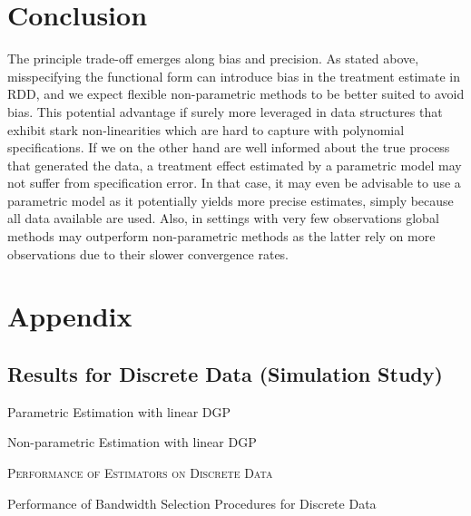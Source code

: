 \documentclass[11pt, a4paper, leqno]{article}
\numberwithin{equation}{section}
\numberwithin{figure}{section}
\numberwithin{table}{section}
\numberwithin{algorithm}{section}
\begin{document}
\section{Conclusion} %
\label{sec: conclusion}



The principle trade-off emerges along bias and precision. As stated above, misspecifying the functional form can introduce bias in the treatment estimate in RDD, and we expect flexible non-parametric methods to be better suited to avoid bias. This potential advantage if surely more leveraged in data structures that exhibit stark non-linearities which are hard to capture with polynomial specifications. If we on the other hand are well informed about the true process that generated the data, a treatment effect estimated by a parametric model may not suffer from specification error. In that case, it may even be advisable to use a parametric model as it potentially yields more precise estimates, simply because all data available are used. Also, in settings with very few observations global methods may outperform non-parametric methods as the latter rely on more observations due to their slower convergence rates.



\clearpage

\clearpage

\setcounter{section}{1}
\renewcommand\thesubsection{\Alph{subsection}}
\renewcommand\thetable{\Alph{section}.\arabic{table}}

\section*{\LARGE Appendix}
\subsection{Results for Discrete Data (Simulation Study)} \label{discrete_data}


\begin{table}[H]
	\begin{subtable}{\textwidth}
		\centering
		
		\caption{Parametric Estimation with linear DGP}
		\label{tab: para_discr}
		\hspace{\fill}
	\end{subtable}
	\begin{subtable}{\textwidth}
		\centering
		
		\caption{Non-parametric Estimation with linear DGP}
		\label{tab: nonpara_discr}
		\hspace{\fill}
	\end{subtable}
	\caption{\textsc{Performance of Estimators on Discrete Data}}
	\label{tab: perf_discr}
\end{table}


\begin{table}[H]
	\begin{subtable}{\textwidth}
		\centering
		
		\caption{Performance of Bandwidth Selection Procedures for Discrete Data}
		\label{tab: bw_perf_discr}
		\hspace{\fill}
	\end{subtable}
\end{table}
\end{document}

